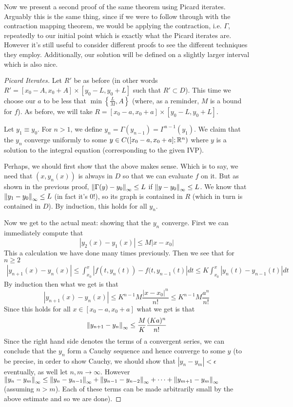 Now we present a second proof of the same theorem using Picard iterates. Arguably this is the same thing, since if we were to follow through with the contraction mapping theorem, we would be applying the contraction, i.e. $\Gamma$, repeatedly to our initial point which is exactly what the Picard iterates are. However it's still useful to consider different proofs to see the different techniques they employ. Additionally, our solution will be defined on a slightly larger interval which is also nice.
\begin{proof}[Picard Iterates]
    Let $R'$ be as before (in other words $R' = [x_0 - A, x_0 + A] \times [y_0 - L, y_0 + L]$ such that $R' \subset D$). This time we choose our $a$ to be less that $\min \left\{ \frac{L}{M}, A \right\}$ (where, as a reminder, $M$ is a bound for $f$). As before, we will take $R = [x_0 - a, x_0 + a] \times [y_0 - L, y_0 + L]$. 
    
    Let $y_1 \equiv y_0$. For $n > 1$, we define $y_n = \Gamma(y_{n - 1}) = \Gamma^{n - 1}(y_1)$. We claim that the $y_n$ converge uniformly to some $y \in C([x_0 - a, x_0 + a]; \mathbb{R}^n)$ where $y$ is a solution to the integral equation (corresponding to the given IVP). 
    
    Perhaps, we should first show that the above makes sense. Which is to say, we need that $(x, y_n(x))$ is always in $D$ so that we can evaluate $f$ on it. But as shown in the previous proof, $\left\lVert\Gamma(y) - y_0\right\rVert_{\infty} \leq L$ if $\left\lVert y - y_{0}\right\rVert_{\infty} \leq L$. We know that $\left\lVert y_1 - y_0\right\rVert_{\infty} \leq L$ (in fact it's 0!), so its graph is contained in $R$ (which in turn is contained in $D$). By induction, this holds for all $y_n$.
    
    Now we get to the actual meat: showing that the $y_n$ converge. 
    First we can immediately compute that 
    $$ |y_2(x) - y_1(x)| \leq M|x - x_0| $$
    This a calculation we have done many times previously.
    Then we see that for $n \geq 2$
    \begin{align*}
        |y_{n + 1}(x) - y_n(x)| \leq \int_{x_0}^{x} |f(t, y_n(t)) - f(t, y_{n - 1}(t)| dt 
        \leq K \int_{x_0}^{x} |y_{n}(t) - y_{n - 1}(t)|dt
    \end{align*}
    By induction then what we get is that 
    $$ |y_{n + 1}(x) - y_n(x)| \leq K^{n - 1} M \frac{|x - x_0|^{n}}{n!} \leq K^{n - 1} M \frac{a^n}{n!} $$
    Since this holds for all $x \in [x_0 - a, x_0 + a]$ what we get is that
    $$ \left\lVert y_{n + 1} - y_{n}\right\rVert_{\infty} \leq \frac{M}{K} \frac{(Ka)^n}{n!} $$
    Since the right hand side denotes the terms of a convergent series, we can conclude that the $y_n$ form a Cauchy sequence and hence converge to some $y$ (to be precise, in order to show Cauchy, we should show that $|y_n - y_m| < \epsilon$ eventually, as well let $n, m \to \infty$. However $\left\lVert y_n - y_m\right\rVert_{\infty} \leq \left\lVert y_{n} - y_{n - 1}\right\rVert_{\infty} + \left\lVert y_{n - 1} - y_{n - 2}\right\rVert_{\infty} + \dots + \left\lVert y_{m + 1} - y _m\right\rVert_{\infty}$ (assuming $n > m$). Each of these terms can be made arbitrarily small by the above estimate and so we are done).
    

\end{proof}
